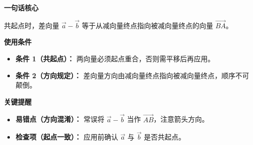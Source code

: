 \begin{summarybox}

	\textbf{\textcolor{CSummary}{一句话核心}}

	共起点时，差向量 $\vec{a}-\vec{b}$ 等于从减向量终点指向被减向量终点的向量 $\overrightarrow{BA}$。

	\medskip
	\textbf{\textcolor{CSummary}{使用条件}}
	\begin{itemize}[leftmargin=*, itemsep=0.5em, topsep=0.4em]
		\item \textbf{条件 1（共起点）：} 两向量必须起点重合，否则需平移后再应用。
		\item \textbf{条件 2（方向规定）：} 差向量方向由减向量终点指向被减向量终点，顺序不可颠倒。
	\end{itemize}

	\medskip
	\textbf{\textcolor{CSummary}{关键提醒}}
	\begin{itemize}[leftmargin=*, itemsep=0.5em, topsep=0.4em]
		\item \textbf{易错点（方向混淆）：} 常误将 $\vec{a}-\vec{b}$ 当作 $\overrightarrow{AB}$，注意箭头方向。
		\item \textbf{检查项（起点一致）：} 应用前确认 $\vec{a}$ 与 $\vec{b}$ 是否共起点。
	\end{itemize}
\end{summarybox}
